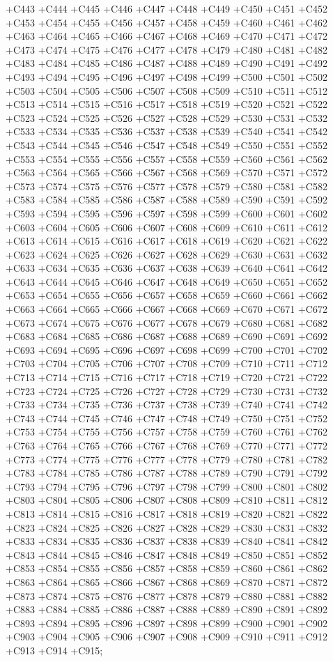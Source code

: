  +C443 +C444 +C445 +C446 +C447 +C448 +C449 +C450 +C451 +C452 +C453 +C454 +C455 +C456 +C457 +C458 +C459
 +C460 +C461 +C462 +C463 +C464 +C465 +C466 +C467 +C468 +C469 +C470 +C471 +C472 +C473 +C474 +C475 +C476
 +C477 +C478 +C479 +C480 +C481 +C482 +C483 +C484 +C485 +C486 +C487 +C488 +C489 +C490 +C491 +C492 +C493
 +C494 +C495 +C496 +C497 +C498 +C499 +C500 +C501 +C502 +C503 +C504 +C505 +C506 +C507 +C508 +C509 +C510
 +C511 +C512 +C513 +C514 +C515 +C516 +C517 +C518 +C519 +C520 +C521 +C522 +C523 +C524 +C525 +C526 +C527
 +C528 +C529 +C530 +C531 +C532 +C533 +C534 +C535 +C536 +C537 +C538 +C539 +C540 +C541 +C542 +C543 +C544
 +C545 +C546 +C547 +C548 +C549 +C550 +C551 +C552 +C553 +C554 +C555 +C556 +C557 +C558 +C559 +C560 +C561
 +C562 +C563 +C564 +C565 +C566 +C567 +C568 +C569 +C570 +C571 +C572 +C573 +C574 +C575 +C576 +C577 +C578
 +C579 +C580 +C581 +C582 +C583 +C584 +C585 +C586 +C587 +C588 +C589 +C590 +C591 +C592 +C593 +C594 +C595
 +C596 +C597 +C598 +C599 +C600 +C601 +C602 +C603 +C604 +C605 +C606 +C607 +C608 +C609 +C610 +C611 +C612
 +C613 +C614 +C615 +C616 +C617 +C618 +C619 +C620 +C621 +C622 +C623 +C624 +C625 +C626 +C627 +C628 +C629
 +C630 +C631 +C632 +C633 +C634 +C635 +C636 +C637 +C638 +C639 +C640 +C641 +C642 +C643 +C644 +C645 +C646
 +C647 +C648 +C649 +C650 +C651 +C652 +C653 +C654 +C655 +C656 +C657 +C658 +C659 +C660 +C661 +C662 +C663
 +C664 +C665 +C666 +C667 +C668 +C669 +C670 +C671 +C672 +C673 +C674 +C675 +C676 +C677 +C678 +C679 +C680
 +C681 +C682 +C683 +C684 +C685 +C686 +C687 +C688 +C689 +C690 +C691 +C692 +C693 +C694 +C695 +C696 +C697
 +C698 +C699 +C700 +C701 +C702 +C703 +C704 +C705 +C706 +C707 +C708 +C709 +C710 +C711 +C712 +C713 +C714
 +C715 +C716 +C717 +C718 +C719 +C720 +C721 +C722 +C723 +C724 +C725 +C726 +C727 +C728 +C729 +C730 +C731
 +C732 +C733 +C734 +C735 +C736 +C737 +C738 +C739 +C740 +C741 +C742 +C743 +C744 +C745 +C746 +C747 +C748
 +C749 +C750 +C751 +C752 +C753 +C754 +C755 +C756 +C757 +C758 +C759 +C760 +C761 +C762 +C763 +C764 +C765
 +C766 +C767 +C768 +C769 +C770 +C771 +C772 +C773 +C774 +C775 +C776 +C777 +C778 +C779 +C780 +C781 +C782
 +C783 +C784 +C785 +C786 +C787 +C788 +C789 +C790 +C791 +C792 +C793 +C794 +C795 +C796 +C797 +C798 +C799
 +C800 +C801 +C802 +C803 +C804 +C805 +C806 +C807 +C808 +C809 +C810 +C811 +C812 +C813 +C814 +C815 +C816
 +C817 +C818 +C819 +C820 +C821 +C822 +C823 +C824 +C825 +C826 +C827 +C828 +C829 +C830 +C831 +C832 +C833
 +C834 +C835 +C836 +C837 +C838 +C839 +C840 +C841 +C842 +C843 +C844 +C845 +C846 +C847 +C848 +C849 +C850
 +C851 +C852 +C853 +C854 +C855 +C856 +C857 +C858 +C859 +C860 +C861 +C862 +C863 +C864 +C865 +C866 +C867
 +C868 +C869 +C870 +C871 +C872 +C873 +C874 +C875 +C876 +C877 +C878 +C879 +C880 +C881 +C882 +C883 +C884
 +C885 +C886 +C887 +C888 +C889 +C890 +C891 +C892 +C893 +C894 +C895 +C896 +C897 +C898 +C899 +C900 +C901
 +C902 +C903 +C904 +C905 +C906 +C907 +C908 +C909 +C910 +C911 +C912 +C913 +C914 +C915; \\

